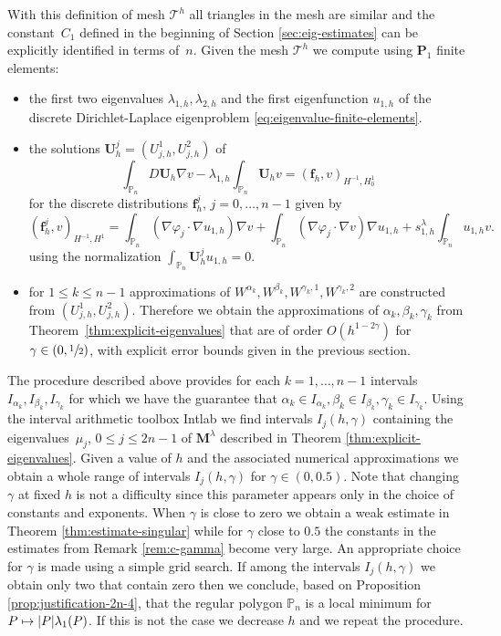 \documentclass[JEP,XML,SOM,Unicode,ThmDefs,NoFloatCountersInSection,published]{cedram}
\def\mto{\mathchoice{\longmapsto}{\mapsto}{\mapsto}{\mapsto}}
\theoremstyle{plain}
\theoremstyle{definition}
\newcommand{\bo}[1]{{\boldsymbol#1}}
\def\Pp{{\mathbb{P}_n}}
\begin{document}
With this definition of mesh $\mathcal T^h$ all triangles in the mesh are similar and the constant~$C_1$ defined in the beginning of Section \ref{sec:eig-estimates} can be explicitly identified in terms of~$n$. Given the mesh $\mathcal T^h$ we compute using $\bo P_1$ finite elements:
\begin{itemize}
\item the first two eigenvalues $\lambda_{1,h},\lambda_{2,h}$ and the first eigenfunction $u_{1,h}$ of the discrete Dirichlet-Laplace eigenproblem \eqref{eq:eigenvalue-finite-elements}.
\item the solutions $\bo U_h^j = (U_{j,h}^1, U_{j,h}^2)$ of
\[
\int_{\Pp} D\bo U_h \nabla v-\lambda_{1,h}\int_\Pp \bo U_h v = (\bo f_h,v)_{H^{-1},H_0^1}
\]
for the discrete distributions $\bo f_h^j$, $j=0,\dots,n-1$ given by
\begin{equation*}
(\bo f_{h}^j,v)_{H^{-1},H^1} = \int_{\Pp}(\nabla \varphi_j \cdot \nabla u_{1,h})\nabla v +\int_{\Pp}(\nabla \varphi_j\cdot \nabla v)\nabla u_{1,h}+s_{1,h}^\lambda \int_\Pp u_{1,h}v.
\end{equation*}
using the normalization $\int_\Pp \bo U_h^j u_{1,h} = 0$.
\item for $1\leq k \leq n-1$ approximations of $W^{\alpha_k},W^{\beta_k},W^{\gamma_k,1},W^{\gamma_k,2}$ are constructed from $(U_{j,h}^1, U_{j,h}^2)$. Therefore we obtain the approximations of $\alpha_k,\beta_k,\gamma_k$ from Theorem~\ref{thm:explicit-eigenvalues} that are of order $O(h^{1-2\gamma})$ for $\gamma \in (0,\sfrac{1}{2})$, with explicit error bounds given in the previous section.
\end{itemize}
The procedure described above provides for each $k=1,\dots,n-1$ intervals $I_{\alpha_k}, I_{\beta_k}, I_{\gamma_k}$ for which we have the guarantee that $\alpha_k \in I_{\alpha_k},\beta_k \in I_{\beta_k}, \gamma_k \in I_{\gamma_k}$. Using the interval arithmetic toolbox Intlab \cite{intlab} we find intervals $I_j (h,\gamma)$ containing the eigenvalues~$\mu_j$, $0 \leq j \leq 2n-1$ of $\bo M^{\lambda}$ described in Theorem \ref{thm:explicit-eigenvalues}. Given a value of $h$ and the associated numerical approximations we obtain a whole range of intervals $I_j(h,\gamma)$ for $\gamma\in (0,0.5)$. Note that changing $\gamma$ at fixed $h$ is not a difficulty since this parameter appears only in the choice of constants and exponents. When $\gamma$ is close to zero we obtain a weak estimate in Theorem \ref{thm:estimate-singular} while for $\gamma$ close to $0.5$ the constants in the estimates from Remark \ref{rem:c-gamma} become very large. An appropriate choice for $\gamma$ is made using a simple grid search. If among the intervals $I_j(h,\gamma)$ we obtain only two that contain zero then we conclude, based on Proposition \ref{prop:justification-2n-4}, that the regular polygon $\Pp$ is a local minimum for $P\mto |P|\lambda_1(P)$. If this is not the case we decrease $h$ and we repeat the procedure.
\end{document}
